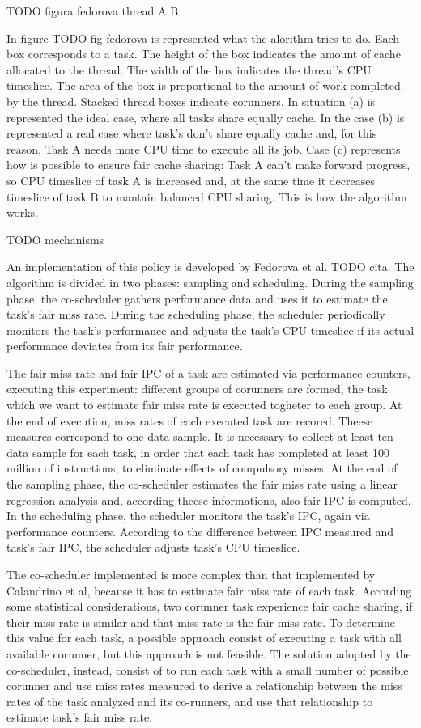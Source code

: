 TODO figura fedorova thread A B

In figure TODO fig fedorova is represented what the alorithm tries to do. Each box corresponds to a task. The height of the box indicates the amount of
cache allocated to the thread. The width of the box indicates the thread's CPU timeslice. The area of the box is proportional to the amount of work 
completed by the thread. Stacked thread boxes indicate corunners. In situation (a) is represented the ideal case, where all tasks share equally 
cache. In the case (b) is represented a real case where task's don't share equally cache and, for this reason, Task A needs more CPU time to execute
all its job. Case (c) represents how is possible to ensure fair cache sharing: Task A can't make forward progress, so CPU timeslice of task A is increased 
and, at the same time it decreases timeslice of task B to mantain balanced CPU sharing. This is how the algorithm works. 

TODO mechanisms

An implementation of this policy is developed by Fedorova et al. TODO cita. The algorithm is divided in two phases: sampling and scheduling. During the 
sampling phase, the co-scheduler gathers performance data and uses it to estimate the task's fair miss rate. During the scheduling phase, the scheduler 
periodically monitors the task's performance and adjusts the task's CPU timeslice if its actual performance deviates from its fair performance.

The fair miss rate and fair IPC of a task are estimated via performance counters, executing this experiment: different groups of corunners are formed, 
the task which we want to estimate fair miss rate is executed togheter to each group. At the end of execution, miss rates of each executed task are 
recored. Theese measures correspond to one data sample. It is necessary to collect at least ten data sample for each task, in order that each task has 
completed at least 100 million of instructions, to eliminate effects of compulsory misses. At the end of the sampling phase, the co-scheduler estimates the 
fair miss rate using a linear regression analysis and, according theese informations, also fair IPC is computed. In the scheduling phase, the scheduler 
monitors the task's IPC, again via performance counters. According to the difference between IPC measured and task's fair IPC, the scheduler adjusts task's 
CPU timeslice.

The co-scheduler implemented is more complex than that implemented by Calandrino et al, because it has to estimate fair miss rate of each task. According 
some statistical considerations, two corunner task experience fair cache sharing, if their miss rate is similar and that miss rate is the fair miss rate.
To determine this value for each task, a possible approach consist of executing a task with all available corunner, but this approach is not feasible.
The solution adopted by the co-scheduler, instead, consist of to run each task with a small number of possible corunner and use miss rates measured to
derive a relationship between the miss rates of the task analyzed and its co-runners, and use that relationship to estimate task's fair miss rate. 

